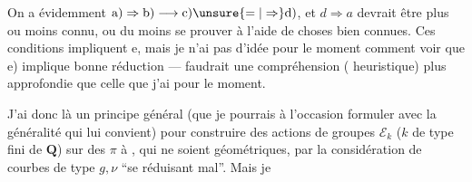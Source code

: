 On a évidemment $\mathrm{a)}\Rightarrow\mathrm{b)}\longrightarrow\mathrm{c)}\unsure{=|\Rightarrow}\mathrm{d)}$, et $d\Rightarrow a$ devrait être plus ou moins connu, ou du moins se prouver à l'aide de choses bien connues. Ces conditions impliquent e, mais je n'ai pas d'idée pour le moment comment voir que e) implique bonne réduction --- faudrait une compréhension ( heuristique) plus approfondie que celle que j'ai pour le moment.

J'ai donc là un principe général (que je pourrais à l'occasion formuler avec la généralité qui lui convient) pour construire des actions   de groupes $\mathcal E_k$ ($k$  de type fini de $\mathbf Q$) sur des $\pi$ à , qui  ne soient géométriques, par  la considération de courbes de type $g,\nu$ ``se réduisant mal''. Mais je 
